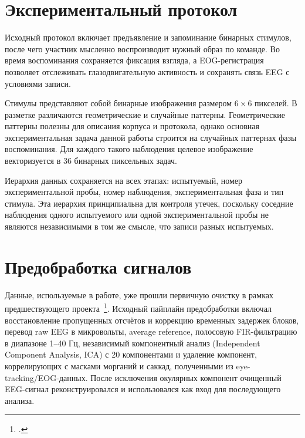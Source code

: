 \section{Экспериментальный протокол}

Исходный протокол включает предъявление и запоминание бинарных стимулов, после
чего участник мысленно воспроизводит нужный образ по команде. Во время
воспоминания сохраняется фиксация взгляда, а EOG-регистрация позволяет
отслеживать глазодвигательную активность и сохранять связь EEG с условиями
записи.

Стимулы представляют собой бинарные изображения размером $6 \times 6$ пикселей.
В разметке различаются геометрические и случайные паттерны. Геометрические
паттерны полезны для описания корпуса и протокола, однако основная
экспериментальная задача данной работы строится на случайных паттернах
фазы воспоминания. Для каждого такого наблюдения целевое изображение
векторизуется в 36 бинарных пиксельных задач.

Иерархия данных сохраняется на всех этапах: испытуемый, номер
экспериментальной пробы, номер наблюдения, экспериментальная фаза и тип стимула.
Эта иерархия принципиальна
для контроля утечек, поскольку соседние наблюдения одного испытуемого или
одной экспериментальной пробы не являются независимыми в том же смысле, что
записи разных испытуемых.

\section{Предобработка сигналов}

Данные, используемые в работе, уже прошли первичную очистку в рамках
предшествующего проекта~\footcite{dementyev2025visualstimuli}. Исходный
пайплайн предобработки включал
восстановление пропущенных отсчётов и коррекцию временных задержек блоков,
перевод raw EEG в микровольты, average reference, полосовую FIR-фильтрацию в
диапазоне 1--40 Гц, независимый компонентный анализ (Independent Component
Analysis, ICA) с 20 компонентами и удаление компонент, коррелирующих с масками
морганий и саккад, полученными из eye-tracking/EOG-данных. После исключения
окулярных компонент очищенный EEG-сигнал реконструировался и использовался как
вход для последующего анализа.

